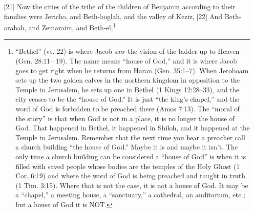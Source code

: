 [21] \textcolor[rgb]{0.00,0.00,1.00}{Now the cities of the tribe of the children of Benjamin according to their families were Jericho, and Beth-hoglah, and the valley of Keziz,}
[22] \textcolor[rgb]{0.00,0.00,1.00}{And Beth-arabah, and Zemaraim, and Beth-el,}\footnote{“Bethel” (vs. 22) is where Jacob saw the
vision of the ladder up to Heaven (Gen. 28:11–
19). The name means “house of God,” and it is
where Jacob goes to get right when he returns
from Haran (Gen. 35:1–7). When Jeroboam
sets up the two golden calves in the northern
kingdom in opposition to the Temple in
Jerusalem, he sets up one in Bethel (1 Kings
12:28–33), and the city ceases to be the “house
of God.” It is just “the king’s chapel,” and the
word of God is forbidden to be preached there
(Amos 7:13).
The “moral of the story” is that when God
is not in a place, it is no longer the house of
God. That happened in Bethel, it happened in
Shiloh, and it happened at the Temple in
Jerusalem. Remember that the next time you
hear a preacher call a church building “the
house of God.” Maybe it is and maybe it isn’t.
The only time a church building can be
considered a “house of God” is when it is filled
with saved people whose bodies are the temples
of the Holy Ghost (1 Cor. 6:19) and where the
word of God is being preached and taught in
truth (1 Tim. 3:15). Where that is not the case,
it is not a house of God. It may be a “chapel,” a
meeting house, a “sanctuary,” a cathedral, an
auditorium, etc.; but a house of God it is NOT.}
